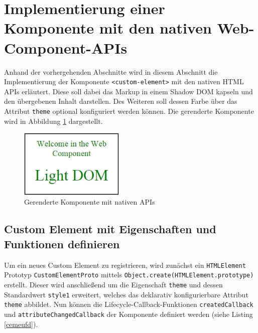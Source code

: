 \section{Implementierung einer Komponente mit den nativen Web-Component-APIs}\label{implementierung-einer-komponente-mit-den-nativen-web-component-apis}

Anhand der vorhergehenden Abschnitte wird in diesem Abschnitt die Implementierung der Komponente \texttt{\textless{}custom-element\textgreater{}} mit den nativen \ac{HTML} APIs erläutert. Diese soll dabei das Markup in einem Shadow \ac{DOM} kapseln und den übergebenen Inhalt darstellen. Des Weiteren soll dessen Farbe über das Attribut \texttt{theme} optional konfiguriert werden können. Die gerenderte Komponente wird in Abbildung \ref{fig:gwkmnapis} dargestellt.

\begin{figure}[htbp]
 \centering
 \includegraphics[width=5cm,keepaspectratio]{kapitel2/bilder/7-beispiel}
 \caption{Gerenderte Komponente mit nativen APIs}
 \label{fig:gwkmnapis}
\end{figure}


\subsection{Custom Element mit Eigenschaften und Funktionen definieren}\label{custom-element-mit-eigenschaften-und-funktionen-definieren}

Um ein neues Custom Element zu registrieren, wird zunächst ein \texttt{\ac{HTML}Element} Prototyp \texttt{CustomElementProto} mittels \texttt{Object.create(\ac{HTML}Element.prototype)} erstellt. Dieser wird anschließend um die Eigenschaft \texttt{theme} und dessen Standardwert \texttt{style1} erweitert, welches das deklarativ konfigurierbare
Attribut \texttt{theme} abbildet. Nun können die Lifecycle-Callback-Funktionen \texttt{createdCallback} und \texttt{attributeChangedCallback} der Komponente definiert werden (siehe Listing \ref{cemeufd}).



